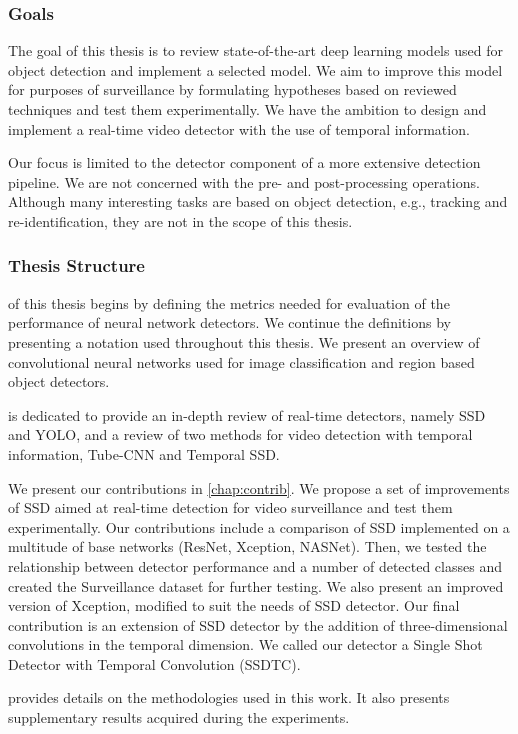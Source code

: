 \subsubsection{Goals}
The goal of this thesis is to review state-of-the-art deep learning models used for object detection and implement a selected model. We aim to improve this model for purposes of surveillance by formulating hypotheses based on reviewed techniques and test them experimentally. We have the ambition to design and implement a real-time video detector with the use of temporal information.

Our focus is limited to the detector component of a more extensive detection pipeline. We are not concerned with the pre- and post-processing operations. Although many interesting tasks are based on object detection, e.g., tracking and re-identification,  they are not in the scope of this thesis.

\subsubsection{Thesis Structure}
 of this thesis begins by defining the metrics needed for evaluation of the performance of neural network detectors. We continue the definitions by presenting a notation used throughout this thesis. We present an overview of convolutional neural networks used for image classification and region based object detectors. 

 is dedicated to provide an in-depth review of real-time detectors, namely SSD and YOLO, and a review of two methods for video detection with temporal information, Tube-CNN and Temporal SSD. 

We present our contributions in \cref{chap:contrib}. We propose a set of improvements of SSD aimed at real-time detection for video surveillance and test them experimentally. Our contributions include a comparison of SSD implemented on a multitude of base networks (ResNet, Xception, NASNet). Then, we tested the relationship between detector performance and a number of detected classes and created the Surveillance dataset for further testing. We also present an improved version of Xception, modified to suit the needs of SSD detector. Our final contribution is an extension of SSD detector by the addition of three-dimensional convolutions in the temporal dimension. We called our detector a Single Shot Detector with Temporal Convolution (SSDTC).

 provides details on the methodologies used in this work. It also presents supplementary results acquired during the experiments.